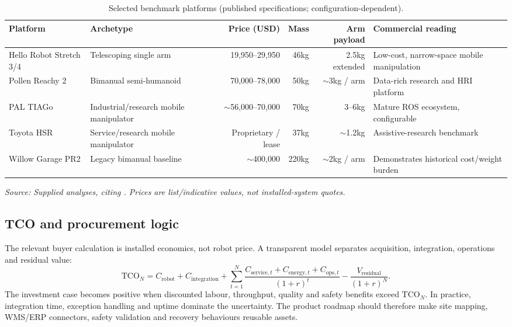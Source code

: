 \documentclass[11pt,a4paper]{article}
\newcommand{\source}[1]{\par\vspace{-0.25em}\footnotesize\color{gray}\emph{Source: #1}\normalsize}
\begin{document}
\begin{table}[ht]
\centering\small
\caption{Selected benchmark platforms (published specifications; configuration-dependent).}
\begin{tabularx}{\textwidth}{@{}lYrrrY@{}}
\toprule
Platform & Archetype & Price (USD) & Mass & Arm payload & Commercial reading \\
\midrule
Hello Robot Stretch 3/4 & Telescoping single arm & 19,950--29,950 & 46kg & 2.5kg extended & Low-cost, narrow-space mobile manipulation \\
Pollen Reachy 2 & Bimanual semi-humanoid & 70,000--78,000 & 50kg & $\sim$3kg / arm & Data-rich research and HRI platform \\
PAL TIAGo & Industrial/research mobile manipulator & $\sim$56,000--70,000 & 70kg & 3--6kg & Mature ROS ecosystem, configurable \\
Toyota HSR & Service/research mobile manipulator & Proprietary / lease & 37kg & $\sim$1.2kg & Assistive-research benchmark \\
Willow Garage PR2 & Legacy bimanual baseline & $\sim$400,000 & 220kg & $\sim$2kg / arm & Demonstrates historical cost/weight burden \\
\bottomrule
\end{tabularx}
\source{Supplied analyses, citing \cite{stretchpaper,reachy,tiago}. Prices are list/indicative values, not installed-system quotes.}
\end{table}

\subsection{TCO and procurement logic}

The relevant buyer calculation is installed economics, not robot price. A transparent model separates acquisition, integration, operations and residual value:
\begin{equation}
 \mathrm{TCO}_{N}=C_{\mathrm{robot}}+C_{\mathrm{integration}}+\sum_{t=1}^{N}\frac{C_{\mathrm{service},t}+C_{\mathrm{energy},t}+C_{\mathrm{ops},t}}{(1+r)^t}-\frac{V_{\mathrm{residual}}}{(1+r)^N}.
\end{equation}
The investment case becomes positive when discounted labour, throughput, quality and safety benefits exceed $\mathrm{TCO}_{N}$. In practice, integration time, exception handling and uptime dominate the uncertainty. The product roadmap should therefore make site mapping, WMS/ERP connectors, safety validation and recovery behaviours reusable assets.
\end{document}
